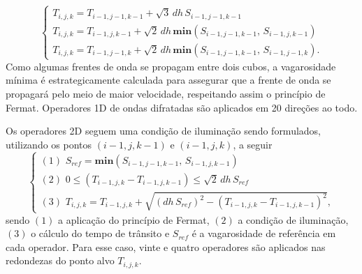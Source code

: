 \begin{equation}
	\begin{cases}
		T_{i,j,k} = T_{i-1,j-1,k-1} + \sqrt{3}\,dh\,S_{i-1,j-1,k-1} \\
		T_{i,j,k} = T_{i-1,j,k-1} + \sqrt{2}\,dh\,\mathbf{min}(S_{i-1,j-1,k-1},\,S_{i-1,j,k-1}) \\
		T_{i,j,k} = T_{i-1,j-1,k} + \sqrt{2}\,dh\,\mathbf{min}(S_{i-1,j-1,k-1},\,S_{i-1,j-1,k}).
	\end{cases}
	\label{1D_diffractions}
\end{equation}
\noindent Como algumas frentes de onda se propagam entre dois cubos, a vagarosidade mínima é estrategicamente calculada para assegurar que a frente de onda se propagará pelo meio de maior velocidade, respeitando assim o princípio de Fermat. Operadores 1D de ondas difratadas são aplicados em 20 direções ao todo. 

Os operadores 2D seguem uma condição de iluminação sendo formulados, utilizando os pontos $(i-1,j,k-1)$ e $(i-1,j,k)$, a seguir
\begin{equation}
	\begin{cases}
		(1) \,\, S_{ref} = \mathbf{min}(S_{i-1,j-1,k-1},\, S_{i-1,j,k-1})  \\
		(2) \,\, 0 \le (T_{i-1,j,k} - T_{i-1,j,k-1}) \le \sqrt{2}\,dh\,S_{ref} \\
		(3) \,\, T_{i,j,k} = T_{i-1,j,k} + \sqrt{(dh\,S_{ref})^2 - (T_{i-1,j,k} - T_{i-1,j,k-1})^2},	
	\end{cases}
	\label{2D_operators}
\end{equation}
\noindent sendo $(1)$ a aplicação do princípio de Fermat, $(2)$ a condição de iluminação, $(3)$ o cálculo do tempo de trânsito e $S_{ref}$ é a vagarosidade de referência em cada operador. Para esse caso, vinte e quatro operadores são aplicados nas redondezas do ponto alvo $T_{i,j,k}$. 

